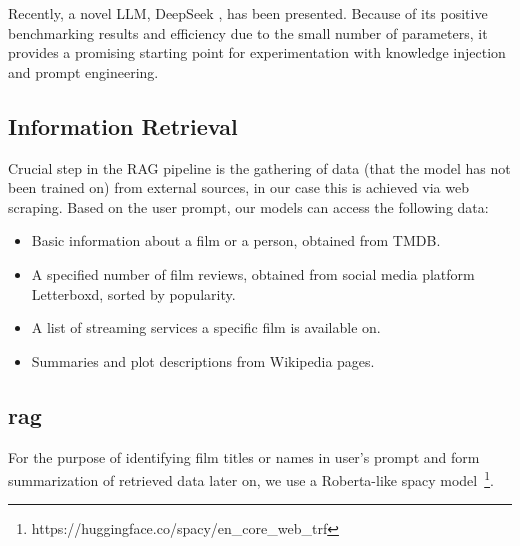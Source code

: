 \documentclass[fleqn,moreauthors,10pt]{ds_report}
\begin{document}

Recently, a novel LLM, DeepSeek \cite{deepseek3}, has been presented. Because of its positive benchmarking results and efficiency due to the small number of parameters, it provides a promising starting point for experimentation with knowledge injection and prompt engineering.


\subsection*{Information Retrieval}



Crucial step in the RAG pipeline is the gathering of data (that the model has not been trained on) from external sources, in our case this is achieved via web scraping. Based on the user prompt, our models can access the following data:
\begin{itemize}
	\item Basic information about a film or a person, obtained from TMDB.
	\item A specified number of film reviews, obtained from social media platform Letterboxd, sorted by popularity.
	\item A list of streaming services a specific film is available on.
	\item Summaries and plot descriptions from Wikipedia pages.
\end{itemize}

\subsection*{\ac{rag}}




For the purpose of identifying film titles or names in user's prompt and form summarization of retrieved data later on, we use a Roberta-like spacy model~\footnote{https://huggingface.co/spacy/en\_core\_web\_trf}.

\end{document}
